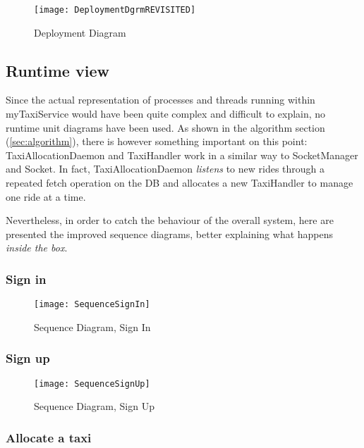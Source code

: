 \begin{sidewaysfigure}
    \centering
    \texttt{[image: DeploymentDgrmREVISITED]}
    \caption{Deployment Diagram}
    \label{fig:deploy}
\end{sidewaysfigure}

\pagebreak

\subsection{Runtime view}
Since the actual representation of processes and threads running within myTaxiService would have been quite complex and difficult to explain, no runtime unit diagrams have been used. As shown in the algorithm section (\ref{sec:algorithm}), there is however something important on this point: TaxiAllocationDaemon and TaxiHandler work in a similar way to SocketManager and Socket. In fact, TaxiAllocationDaemon \emph{listens} to new rides through a repeated fetch operation on the DB and allocates a new TaxiHandler to manage one ride at a time.

Nevertheless, in order to catch the behaviour of the overall system, here are presented the improved sequence diagrams, better explaining what happens \emph{inside the box}.

\subsubsection{Sign in} %
\label{ssec:signin}
\begin{figure}[H]
    \centering
    \texttt{[image: SequenceSignIn]}
    \caption{Sequence Diagram, Sign In}
    \label{fig:signin}
\end{figure}

\subsubsection{Sign up} %
\label{ssec:signup}

\begin{figure}[H]
    \centering
    \texttt{[image: SequenceSignUp]}
    \caption{Sequence Diagram, Sign Up}
    \label{fig:signup}
\end{figure}

\subsubsection{Allocate a taxi} %
\label{ssec:allocate}

